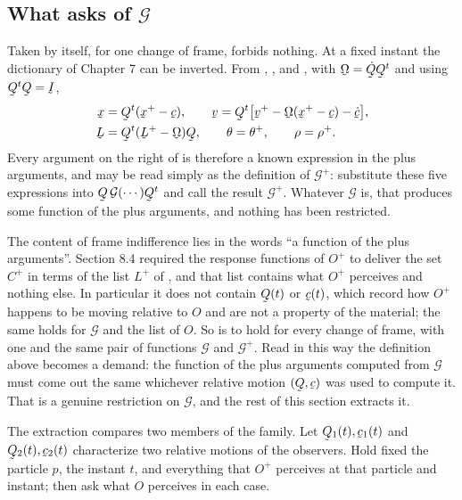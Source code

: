 \subsection*{What  asks of $\mathcal{G}$}

Taken by itself, for one change of frame,  forbids nothing. At
a fixed instant the dictionary of Chapter 7 can be inverted. From
, ,  and , with
$\bOm=\dot\bQ\bQ^{t}$ and using $\bQ^{t}\bQ=\I$,
\[
\begin{aligned}
   \bx&=\bQ^{t}(\bx^{+}-\bc),\qquad
   \bv=\bQ^{t}\big[\bv^{+}-\bOm(\bx^{+}-\bc)-\dot\bc\big],\\
   \bL&=\bQ^{t}(\bL^{+}-\bOm)\bQ,\qquad
   \theta=\theta^{+},\qquad \rho=\rho^{+}.
\end{aligned}
\]
Every argument on the right of  is therefore a known
expression in the plus arguments, and  may be read simply as
the definition of $\mathcal{G}^{+}$: substitute these five expressions
into $\bQ\,\mathcal{G}(\cdots)\bQ^{t}$ and call the result
$\mathcal{G}^{+}$. Whatever $\mathcal{G}$ is, that produces some
function of the plus arguments, and nothing has been restricted.

The content of frame indifference lies in the words ``a function of the
plus arguments''. Section 8.4 required the response functions of
$O^{+}$ to deliver the set $C^{+}$ in terms of the list $L^{+}$ of
, and that list contains what $O^{+}$ perceives and nothing
else. In particular it does not contain $\bQ(t)$ or $\bc(t)$, which
record how $O^{+}$ happens to be moving relative to $O$ and are not a
property of the material; the same holds for $\mathcal{G}$ and the list
of $O$. So  is to hold for every change of frame, with one and
the same pair of functions $\mathcal{G}$ and $\mathcal{G}^{+}$. Read in
this way the definition above becomes a demand: the function of the
plus arguments computed from $\mathcal{G}$ must come out the same
whichever relative motion $(\bQ,\bc)$ was used to compute it. That is a
genuine restriction on $\mathcal{G}$, and the rest of this section
extracts it.

The extraction compares two members of the family. Let
$\bQ_{1}(t),\bc_{1}(t)$ and $\bQ_{2}(t),\bc_{2}(t)$ characterize two
relative motions of the observers. Hold fixed the particle $p$, the
instant $t$, and everything that $O^{+}$ perceives at that particle and
instant; then ask what $O$ perceives in each case.

